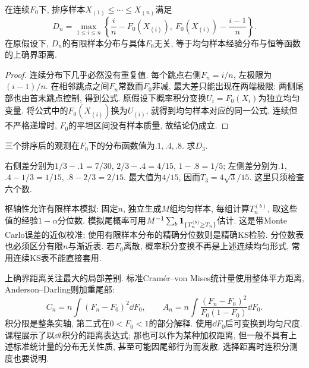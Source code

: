 \begin{proposition}[实际计算与枢轴性]
在连续$F_0$下, 排序样本$X_{(1)}\leq\cdots\leq X_{(n)}$满足
\[
 D_n=\max_{1\leq i\leq n}\left\{\frac{i}{n}-F_0(X_{(i)}),\ F_0(X_{(i)})-\frac{i-1}{n}\right\}.
\]
在原假设下, $D_n$的有限样本分布与具体$F_0$无关, 等于均匀样本经验分布与恒等函数的上确界距离.
\end{proposition}
\begin{proof}
连续分布下几乎必然没有重复值. 每个跳点右侧$F_n=i/n$, 左极限为$(i-1)/n$. 在相邻跳点之间$F_n$常数而$F_0$非减, 最大差只能出现在两端极限; 两侧尾部也由首末跳点控制, 得到公式. 原假设下概率积分变换$U_i=F_0(X_i)$为独立均匀变量. 将公式中的$F_0(X_{(i)})$换为$U_{(i)}$, 就得到均匀样本对应的同一公式. 连续但不严格递增时, $F_0$的平坦区间没有样本质量, 故结论仍成立.
\end{proof}
\begin{example}
三个排序后的观测在$F_0$下的分布函数值为$.1,.4,.8$. 求$D_3$.
\end{example}
\begin{solution}
右侧差分别为$1/3-.1=7/30$, $2/3-.4=4/15$, $1-.8=1/5$; 左侧差分别为$.1$, $.4-1/3=1/15$, $.8-2/3=2/15$. 最大值为$4/15$, 因而$T_3=4\sqrt3/15$. 这里只须检查六个数.
\end{solution}
枢轴性允许有限样本模拟: 固定$n$, 独立生成$M$组均匀样本, 每组计算$T_n^{(b)}$, 取这些值的经验$1-\alpha$分位数. 模拟尾概率可用$M^{-1}\sum_b\mathbf 1_{\{T_n^{(b)}\geq T_n\}}$估计. 这是带Monte Carlo误差的近似校准; 使用有限样本分布的精确分位数则是精确KS检验. 分位数表也必须区分有限$n$与渐近表. 若$F_0$离散, 概率积分变换不再是上述连续均匀形式, 常用连续KS表不能直接套用.

上确界距离关注最大的局部差别. 标准Cram\'er--von Mises统计量使用整体平方距离, Anderson--Darling则加重尾部:
\[
 C_n=n\int(F_n-F_0)^2\dd F_0,\qquad
 A_n=n\int\frac{(F_n-F_0)^2}{F_0(1-F_0)}\dd F_0.
\]
积分限是整条实轴, 第二式在$0<F_0<1$的部分解释. 使用$\dd F_0$后可变换到均匀尺度. 课程展示了以$\dd t$积分的距离表达式; 那也可以作为某种加权距离, 但一般不具有上述标准统计量的分布无关性质, 甚至可能因尾部行为而发散. 选择距离时连积分测度也要说明.

